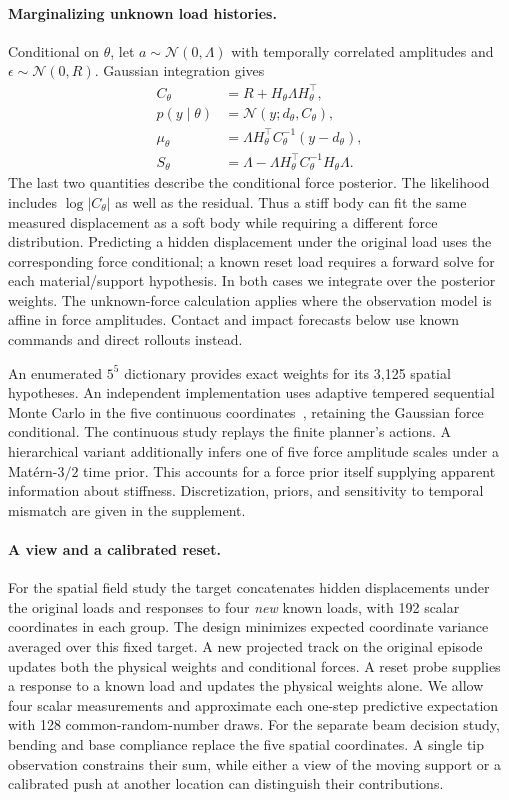 \documentclass[10pt,twocolumn,letterpaper]{article}
\begin{document}
\paragraph{Marginalizing unknown load histories.}
Conditional on $\theta$, let $a\sim\mathcal N(0,\Lambda)$ with temporally correlated amplitudes and $\epsilon\sim\mathcal N(0,R)$. Gaussian integration gives
\begin{align}
 C_\theta &= R+H_\theta\Lambda H_\theta^\top,\\
 p(y\mid\theta)&=\mathcal N(y;d_\theta,C_\theta),\\
 \mu_\theta&=\Lambda H_\theta^\top C_\theta^{-1}(y-d_\theta),\\
 S_\theta&=\Lambda-\Lambda H_\theta^\top C_\theta^{-1}H_\theta\Lambda .
 \label{eq:conditional}
\end{align}
The last two quantities describe the conditional force posterior. The likelihood includes $\log|C_\theta|$ as well as the residual. Thus a stiff body can fit the same measured displacement as a soft body while requiring a different force distribution. Predicting a hidden displacement under the original load uses the corresponding force conditional; a known reset load requires a forward solve for each material/support hypothesis. In both cases we integrate over the posterior weights. The unknown-force calculation applies where the observation model is affine in force amplitudes. Contact and impact forecasts below use known commands and direct rollouts instead.

An enumerated $5^5$ dictionary provides exact weights for its 3,125 spatial hypotheses. An independent implementation uses adaptive tempered sequential Monte Carlo in the five continuous coordinates~\cite{delmoral2006smc}, retaining the Gaussian force conditional. The continuous study replays the finite planner's actions. A hierarchical variant additionally infers one of five force amplitude scales under a Mat\'ern-$3/2$ time prior. This accounts for a force prior itself supplying apparent information about stiffness. Discretization, priors, and sensitivity to temporal mismatch are given in the supplement.

\paragraph{A view and a calibrated reset.}
For the spatial field study the target concatenates hidden displacements under the original loads and responses to four \emph{new} known loads, with 192 scalar coordinates in each group. The design minimizes expected coordinate variance averaged over this fixed target. A new projected track on the original episode updates both the physical weights and conditional forces. A reset probe supplies a response to a known load and updates the physical weights alone. We allow four scalar measurements and approximate each one-step predictive expectation with 128 common-random-number draws. For the separate beam decision study, bending and base compliance replace the five spatial coordinates. A single tip observation constrains their sum, while either a view of the moving support or a calibrated push at another location can distinguish their contributions.
\end{document}
